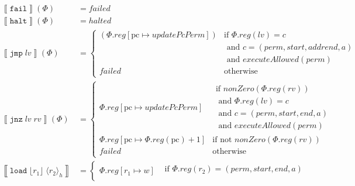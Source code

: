 \documentclass{article}
\newcommand{\update}[2]{[#1 \mapsto #2]}%
\newcommand{\var}[1]{\mathit{#1}}
\newcommand{\rv}{rv}
\newcommand{\lv}{lv}
\newcommand{\pcreg}{\mathrm{pc}}
\newcommand{\addr}{a}
\newcommand{\start}{start}
\newcommand{\addrend}{end}
\newcommand{\reg}{reg}
\newcommand{\perm}{perm}
\newcommand{\failed}{\mathit{failed}}
\newcommand{\halted}{\mathit{halted}}
\newcommand{\plainfun}[1]{\mathit{#1}}
\newcommand{\updatePcPerm}[1]{\plainfun{updatePcPerm}}
\newcommand{\executeAllowed}[1]{\plainfun{executeAllowed}(#1)}
\newcommand{\nonZero}[1]{\plainfun{nonZero}(#1)}
\newcommand{\refreg}[1]{\lfloor #1 \rfloor}
\newcommand{\refheap}[1]{\langle #1 \rangle_h}
\newcommand{\instr}[1]{\mathtt{#1}}
\newcommand{\fail}{\instr{fail}}
\newcommand{\halt}{\instr{halt}}
\newcommand{\oneinstr}[2]{\instr{#1} \; #2}
\newcommand{\jmp}[1]{\oneinstr{jmp}{#1}}
\newcommand{\twoinstr}[3]{\instr{#1} \; #2 \; #3}
\newcommand{\jnz}[2]{\twoinstr{jnz}{#1}{#2}}
\newcommand{\load}[2]{\twoinstr{load}{#1}{#2}}
\newcommand{\sem}[1]{\left\llbracket #1 \right\rrbracket}
\begin{document}
\begin{align*}
  \sem{\fail}(\Phi)     & = \failed \\
  \sem{\halt}(\Phi)     & = \halted \\
  \sem{\jmp{\lv}}(\Phi) & = \begin{cases}
                            (\Phi.\reg\update{\pcreg}{\updatePcPerm{c}}) & \text{if }\Phi.reg(lv) = c \\
                                                                         & \text{  and }c=(\perm,\start,addrend,\addr)\\
                                                                         & \text{  and }\executeAllowed{\perm}\\
                            \failed & \text{otherwise }
                            \end{cases} \\
  \sem{\jnz{\lv}{\rv}}(\Phi) & = \begin{cases}
                            \Phi.\reg\update{\pcreg}{\updatePcPerm{\var{c}}} &
                            \begin{array}{l}
                              \text{if $\nonZero{\Phi.\reg(\rv)}$} \\ 
                              \text{  and $\Phi.reg(lv) = c$} \\
                              \text{  and $c=(\perm,\start,\addrend,\addr)$}\\
                              \text{  and $\executeAllowed{\perm}$}
                            \end{array}
                            \\ %
                            \Phi.\reg\update{\pcreg}{\Phi.\reg(\pcreg) + 1} & \text{if not $\nonZero{\Phi.\reg(\rv)}$}\\
                            \failed & \text{otherwise }
                            \end{cases} \\
 \sem{\load{\refreg{r_1}}{\refheap{r_2}}} & =
                                 \begin{cases}
                                   \Phi.\reg\update{r_1}{\var{w}} &
                                   \begin{array}{l}
                                     \text{if }\Phi.\reg(r_2) = (\perm,\start,\addrend,\addr)\\

\end{array}
\end{cases}
\end{align*}
\end{document}
